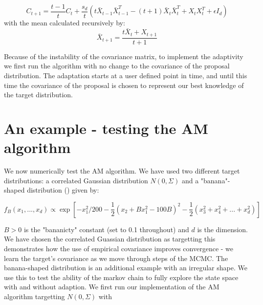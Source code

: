 \documentclass{article}
\begin{document}
$$
C_{t+1} = \frac{t-1}{t} C_t + \frac{s_d}{t}(t \bar{X}_{t-1}\bar{X}^T_{t-1} - (t+1)\bar{X}_t \bar{X}^T_t + X_tX_t^T + \epsilon I_d)
$$
 with the mean calculated recursively by:
$$
\bar{X}_{t+1} = \frac{t \bar{X}_{t}  + X_{t+1}}{t+1}
$$

Because of the instability of the covariance matrix, to implement the adaptivity we first run the algorithm with no change to the covariance of the proposal distribution. The adaptation starts at a user defined point in time, and until this time the covariance of the proposal is chosen to represent our best knowledge of the target distribution.

\section{An example - testing the AM algorithm}

We now numerically test the AM algorithm. We have used two different target distributions: a correlated Gaussian distribution $N(0,\Sigma)$ and a "banana"-shaped distribution (\citep{roberts2009}) given by:

$$
f_B\left(x_1,...,x_d\right)\propto \exp \left[ -x_1^2/200 - \frac{1}{2} \left(x_2 + Bx_1^2-100B\right)^2 - \frac{1}{2} \left(x_3^2 + x_4^2 + ... + x_d^2\right) \right]
$$

$B > 0$ is the "bananicty" constant (set to 0.1 throughout) and $d$ is the dimension. We have chosen the correlated Guassian distribution as targetting this demonstrates how the use of empirical covariance improves convergence - we learn the target's covariance as we move through steps of the MCMC. The banana-shaped distribution is an additional example with an irregular shape. We use this to test the ability of the markov chain to fully explore the state space with and without adaption. We first run our implementation of the AM algorithm targetting $N(0,\Sigma)$ with %
\end{document}

